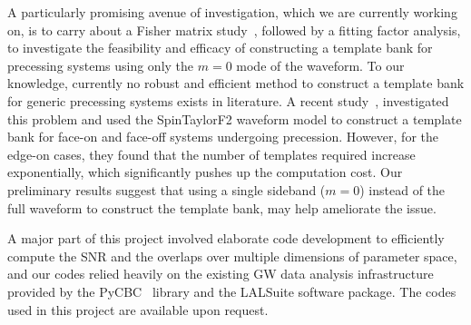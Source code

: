 A particularly promising avenue of investigation, which we are currently
working on, is to carry about a Fisher matrix study~\cite{Fisher}, followed by
a fitting factor analysis, to investigate the feasibility and efficacy of
constructing a template bank for precessing systems using only the $m=0$ mode
of the waveform. To our knowledge, currently no robust and efficient method to
construct a template bank for generic precessing systems exists in literature.
A recent study~\cite{Nat2017}, investigated this problem and used the
SpinTaylorF2 waveform model to construct a template bank for face-on and 
face-off systems undergoing precession. However, for the edge-on cases, they found
that the number of templates required increase exponentially, which
significantly pushes up the computation cost. Our preliminary results suggest
that using a single sideband ($m=0$) instead of the full waveform to construct
the template bank, may help ameliorate the issue.

A major part of this project involved elaborate code development to
efficiently compute the SNR and the overlaps over multiple dimensions of
parameter space, and our codes relied heavily on the existing GW data analysis
infrastructure provided by the PyCBC~\cite{Canton:2014ena,Usman:2015kfa}
library and the LALSuite software package. The codes used in this project are
available upon request.



